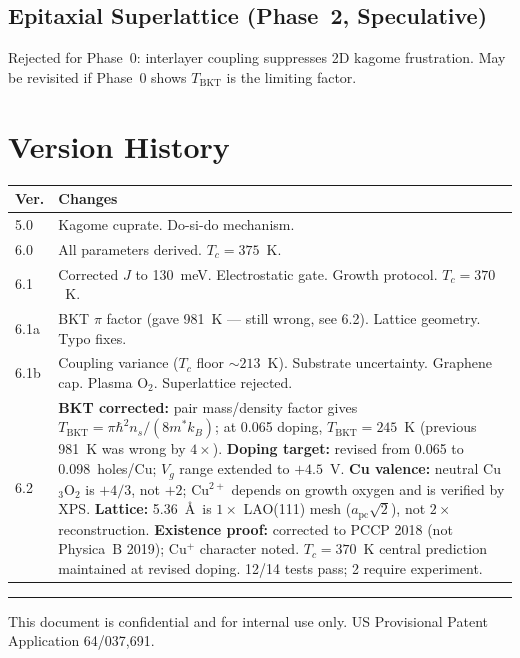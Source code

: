 \documentclass[11pt, a4paper]{article}
\begin{document}
\subsection{Epitaxial Superlattice (Phase~2, Speculative)}

Rejected for Phase~0: interlayer coupling suppresses 2D kagome
frustration. May be revisited if Phase~0 shows
$T_{\text{BKT}}$ is the limiting factor.

\section{Version History}

\begin{center}
\begin{tabular}{@{}lp{9cm}@{}}
\toprule
\textbf{Ver.} & \textbf{Changes} \\
\midrule
5.0 & Kagome cuprate. Do-si-do mechanism. \\
6.0 & All parameters derived. $T_c = 375$~K. \\
6.1 & Corrected $J$ to 130~meV. Electrostatic gate.
      Growth protocol. $T_c = 370$~K. \\
6.1a & BKT $\pi$ factor (gave 981~K --- still wrong, see 6.2).
      Lattice geometry. Typo fixes. \\
6.1b & Coupling variance ($T_c$ floor $\sim 213$~K). Substrate
      uncertainty. Graphene cap. Plasma O$_2$. Superlattice
      rejected. \\
6.2 & \textbf{BKT corrected:} pair mass/density factor gives
      $T_{\text{BKT}} = \pi\hbar^2 n_s/(8m^*k_B)$; at 0.065
      doping, $T_{\text{BKT}} = 245$~K (previous 981~K was
      wrong by $4\times$).
      \textbf{Doping target:} revised from 0.065 to
      0.098~holes/Cu; $V_g$ range extended to $+4.5$~V.
      \textbf{Cu valence:} neutral Cu$_3$O$_2$ is $+4/3$, not
      $+2$; Cu$^{2+}$ depends on growth oxygen and is verified
      by XPS.
      \textbf{Lattice:} 5.36~\AA\ is $1\times$ LAO(111) mesh
      ($a_{\text{pc}}\sqrt{2}$), not $2\times$ reconstruction.
      \textbf{Existence proof:} corrected to PCCP 2018 (not
      Physica~B 2019); Cu$^+$ character noted.
      $T_c = 370$~K central prediction maintained at revised
      doping. 12/14 tests pass; 2 require experiment. \\
\bottomrule
\end{tabular}
\end{center}

\vspace{2em}\hrule\vspace{0.5em}
{\color{nm-gray}\small This document is confidential and for
internal use only. US Provisional Patent Application 64/037,691.}
\end{document}
